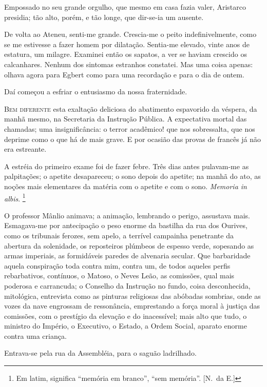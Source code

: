 Empossado no
seu grande orgulho, que mesmo em casa fazia valer, Aristarco presidia;
tão alto, porém, e tão longe, que dir{}-se{}-ia um ausente. 

De volta ao Ateneu, senti{}-me grande. 
Crescia{}-me o peito indefinivelmente, 
como se me estivesse a fazer homem por dilatação. 
Sentia{}-me elevado, vinte
anos de estatura, um milagre. Examinei então os sapatos, a ver se
haviam crescido os calcanhares. Nenhum dos sintomas estranhos
constatei. Mas uma coisa apenas: olhava agora para Egbert como para uma
recordação e para o dia de ontem. 

Daí começou a esfriar o entusiasmo da nossa fraternidade. 

\sectionitem

\noindent\textsc{Bem diferente} esta exaltação deliciosa do abatimento espavorido da
véspera, da manhã mesmo, na Secretaria da Instrução Pública. A
expectativa mortal das chamadas; uma insignificância: o terror
acadêmico! que nos sobressalta, que nos deprime como o que há de mais
grave. E por ocasião das provas de francês já não era estreante. 

A estréia do primeiro exame foi de fazer febre. Três dias antes
pulavam{}-me as palpitações; o apetite desapareceu; o sono depois do
apetite; na manhã do ato, as noções mais elementares da matéria com o
apetite e com o sono. \textit{Memoria in albis}.
\footnote{ Em latim, significa ``memória em branco'', ``sem memória''. [N.~da E.]} 

O professor Mânlio animava; a
animação, lembrando o perigo, assustava mais. Esmagava{}-me por
antecipação o peso enorme da bastilha da rua dos Ourives, como os
tribunais ferozes, sem apelo, a terrível campainha penetrante da
abertura da solenidade, os reposteiros plúmbeos de espesso verde,
sopesando as armas imperiais, as formidáveis paredes de alvenaria
secular. Que barbaridade aquela conspiração toda contra mim, contra um,
de todos aqueles perfis rebarbativos, contínuos, o Matoso, o Neves
Leão, as comissões, qual mais poderosa e carrancuda; o Conselho da
Instrução no fundo, coisa desconhecida, mitológica, entrevista como as
pinturas religiosas das abóbadas sombrias, onde as vozes da nave
engrossam de ressonância, emprestando a força moral à justiça das
comissões, com o prestígio da elevação e do inacessível; mais alto que tudo, 
o ministro do Império, o Executivo, o Estado, a Ordem Social, aparato enorme
contra uma criança. 

Entrava{}-se pela rua da Assembléia, para o saguão ladrilhado. 

